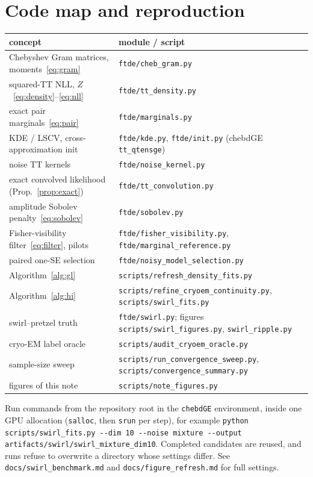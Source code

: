 \clearpage
\appendix
\section{Code map and reproduction}
\label{app:code}
\begin{center}
\small
\begin{tabular}{p{}p{}}
\toprule
concept & module / script \\
\midrule
Chebyshev Gram matrices, moments~\eqref{eq:gram} & \texttt{ftde/cheb\_gram.py}\\
squared-TT NLL, $Z$~\eqref{eq:density}--\eqref{eq:nll} & \texttt{ftde/tt\_density.py}\\
exact pair marginals~\eqref{eq:pair} & \texttt{ftde/marginals.py}\\
KDE / LSCV, cross-approximation init & \texttt{ftde/kde.py}, \texttt{ftde/init.py} (chebdGE \texttt{tt\_qtensge})\\
noise TT kernels & \texttt{ftde/noise\_kernel.py}\\
exact convolved likelihood (Prop.~\ref{prop:exact}) & \texttt{ftde/tt\_convolution.py}\\
amplitude Sobolev penalty~\eqref{eq:sobolev} & \texttt{ftde/sobolev.py}\\
Fisher-visibility filter~\eqref{eq:filter}, pilots & \texttt{ftde/fisher\_visibility.py}, \texttt{ftde/marginal\_reference.py}\\
paired one-SE selection & \texttt{ftde/noisy\_model\_selection.py}\\
Algorithm~\ref{alg:gl} & \texttt{scripts/refresh\_density\_fits.py}\\
Algorithm~\ref{alg:hi} & \texttt{scripts/refine\_cryoem\_continuity.py}, \texttt{scripts/swirl\_fits.py}\\
swirl--pretzel truth & \texttt{ftde/swirl.py}; figures \texttt{scripts/swirl\_figures.py}, \texttt{swirl\_ripple.py}\\
cryo-EM label oracle & \texttt{scripts/audit\_cryoem\_oracle.py}\\
sample-size sweep & \texttt{scripts/run\_convergence\_sweep.py}, \texttt{scripts/convergence\_summary.py}\\
figures of this note & \texttt{scripts/note\_figures.py}\\
\bottomrule
\end{tabular}
\end{center}
Run commands from the repository root in the \texttt{chebdGE} environment, inside one GPU allocation (\texttt{salloc}, then
\texttt{srun} per step), for example
\texttt{python scripts/swirl\_fits.py -{}-dim 10 -{}-noise mixture -{}-output artifacts/swirl/swirl\_mixture\_dim10}.
Completed candidates are reused, and runs refuse to overwrite a directory whose settings differ.
See \texttt{docs/swirl\_benchmark.md} and \texttt{docs/figure\_refresh.md} for full settings.
